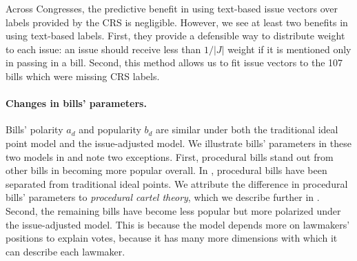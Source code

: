 Across Congresses, the predictive benefit in using text-based issue
vectors over labels provided by the CRS is negligible.  However, we
see at least two benefits in using text-based labels.  First, they
provide a defensible way to distribute weight to each issue: an issue
should receive less than $1 / |J|$ weight if it is mentioned only in
passing in a bill.  Second, this method allows us to fit issue vectors
to the 107 bills which were missing CRS labels.

\paragraph{Changes in bills' parameters.}
Bills' polarity $a_d$ and popularity $b_d$ are similar under both the
traditional ideal point model and the issue-adjusted model. We
illustrate bills' parameters in these two models in
 and note two exceptions.  First,
procedural bills stand out from other bills in becoming more popular
overall.  In , procedural bills have
been separated from traditional ideal points.  We attribute the
difference in procedural bills' parameters to \emph{procedural cartel
  theory}, which we describe further in
.  Second, the remaining bills have
become less popular but more polarized under the issue-adjusted model.
This is because the model depends more on lawmakers' positions to
explain votes, because it has many more dimensions with which it can
describe each lawmaker.
